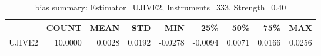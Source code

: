 \begin{table}[ht]
\centering
\caption{bias summary: Estimator=UJIVE2, Instruments=333, Strength=0.40}
\begin{tabular}{lrrrrrrrr}
\toprule
 & COUNT & MEAN & STD & MIN & 25\% & 50\% & 75\% & MAX \\
\midrule
UJIVE2 & 10.0000 & 0.0028 & 0.0192 & -0.0278 & -0.0094 & 0.0071 & 0.0166 & 0.0256 \\
\bottomrule
\end{tabular}
\end{table}
